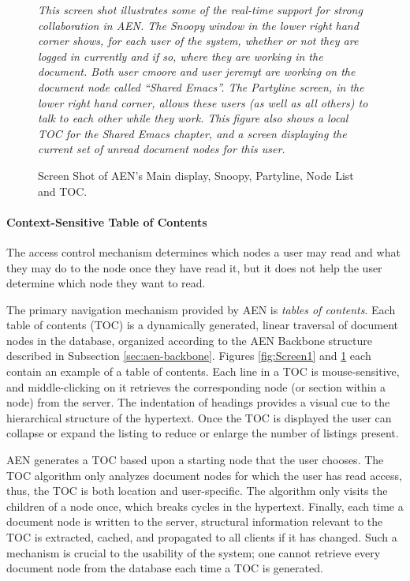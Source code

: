 \begin{figure}%
 \centerline{}
 {\em This screen shot illustrates some of the real-time support
for strong collaboration in AEN.  The Snoopy window in the lower right hand
corner shows, for each user of the system, whether or not they are logged
in currently and if so, where they are working in the document.  Both user
cmoore and user jeremyt are working on the document node called ``Shared
Emacs''.  The Partyline screen, in the lower right hand corner, allows these
users (as well as all others) to talk to each other while they work.  This
figure also shows a local TOC for the Shared Emacs chapter, and a screen
displaying the current set of unread document nodes for this user.}
 \caption{Screen Shot of AEN's Main display, Snoopy, Partyline,  Node List
 and TOC.}
 \label{fig:Screen2}
\end{figure}

\paragraph{Context-Sensitive Table of Contents}

The access control mechanism determines which nodes a user may read and
what they may do to the node once they have read it, but it does not help
the user determine which node they want to read.

The primary navigation mechanism  provided by AEN is {\em tables of
contents}.  Each table of contents (TOC) is a dynamically generated, linear
traversal of document nodes in the database, organized according to the AEN
Backbone structure described in Subsection \ref{sec:aen-backbone}.  Figures
\ref{fig:Screen1} and \ref{fig:Screen2} each contain an example of a table
of contents.  Each line in a TOC is mouse-sensitive, and middle-clicking on
it retrieves the corresponding node (or section within a node) from the
server.  The indentation of headings provides a visual cue to the
hierarchical structure of the hypertext.  Once the TOC is displayed the
user can collapse or expand the listing to reduce or enlarge the number of
listings present.


AEN generates a TOC based upon a starting node that the user chooses.  The
TOC algorithm only analyzes document nodes for which the user has read
access, thus, the TOC is both location and user-specific.  The algorithm
only visits the children of a node once, which breaks cycles in the
hypertext. Finally, each time a document node is written to the server,
structural information relevant to the TOC is extracted, cached, and
propagated to all clients if it has changed. Such a mechanism is crucial to
the usability of the system; one cannot retrieve every document node from
the database each time a TOC is generated.



